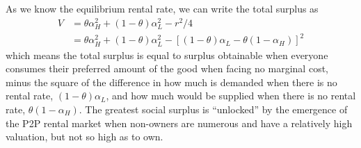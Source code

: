 \documentclass[11pt]{article}
\newcommand{\important}[1]{\textcolor{red}{\textbf{#1}}}
\newcommand{\important}[1]{#1}
\begin{document}
As we know the equilibrium rental rate, we can write the total surplus as
\begin{align}
  V & = \theta \alpha_H^2 + (1-\theta)\alpha_L^2 - r^2/4 \\
    & = \theta \alpha_H^2 + (1-\theta)\alpha_L^2 - \left[(1-\theta) \alpha_L - \theta (1-\alpha_H) \right]^2
\end{align} 
which means the total surplus is equal to surplus obtainable when everyone consumes their preferred amount of the good when facing no marginal cost, minus the square of the difference in how much is demanded when there is no rental rate, $(1-\theta)\alpha_L$, and how much would be supplied when there is no rental rate, $\theta (1-\alpha_H)$.
The greatest social surplus is ``unlocked'' by the emergence of the P2P rental market when non-owners are numerous and have a relatively high valuation, but not so high as to own. 


\end{document}

